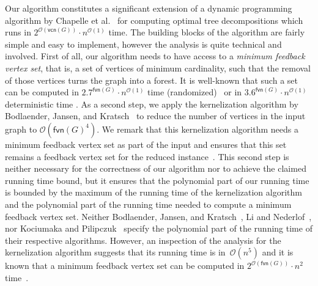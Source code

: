 \documentclass[a4paper,UKenglish,cleveref, autoref, thm-restate, numberwithinsect]{lipics-v2021}
\newcounter{algorithm}
\newcommand{\OO}{\mathcal{O}}
\newcommand{\fvn}{\mathsf{fvn}}
\newcommand{\vcn}{\mathsf{vcn}}
\begin{document}
Our algorithm constitutes a significant extension of a dynamic programming algorithm by Chapelle et al.~\cite{chapelle2017treewidth} for computing optimal tree decompositions which runs in  $2^{\OO(\vcn(G))}\cdot n^{\OO(1)}$ time. The building blocks of the algorithm are fairly simple and easy to implement, however the analysis is quite technical and involved. 
First of all, our algorithm needs to have access to a \emph{minimum feedback vertex set}, that is, a set of vertices of minimum cardinality, such that the removal of those vertices turns the graph into a forest. It is well-known that such a set can be computed in $2.7^{\fvn(G)}\cdot n^{\OO(1)}$ time (randomized)~\cite{li2022detecting} or in $3.6^{\fvn(G)}\cdot n^{\OO(1)}$ deterministic time \cite{kociumaka2014faster}.
As a second step, we apply the kernelization algorithm by Bodlaender, Jansen, and Kratsch~\cite{bodlaender2013preprocessing} to reduce the number of vertices in the input graph to $\OO(\fvn(G)^4)$. We remark that this kernelization algorithm needs a minimum feedback vertex set as part of the input and ensures that this set remains a feedback vertex set for the reduced instance~\cite{bodlaender2013preprocessing}. This second step is neither necessary for the correctness of our algorithm nor to achieve the claimed running time bound, but it ensures that the polynomial part of our running time is bounded by the maximum of the running time of the kernelization algorithm and the polynomial part of the running time needed to compute a minimum feedback vertex set. Neither Bodlaender, Jansen, and Kratsch~\cite{bodlaender2013preprocessing}, Li and Nederlof~\cite{li2022detecting}, nor Kociumaka and Pilipczuk~\cite{kociumaka2014faster} specify the polynomial part of the running time of their respective algorithms. However, an inspection of the analysis for the kernelization algorithm suggests that its running time is in~$\OO(n^5)$ and it is known that a minimum feedback vertex set can be computed in $2^{\OO(\fvn(G))}\cdot n^{2}$ time~\cite{Cao18}.
\end{document}
